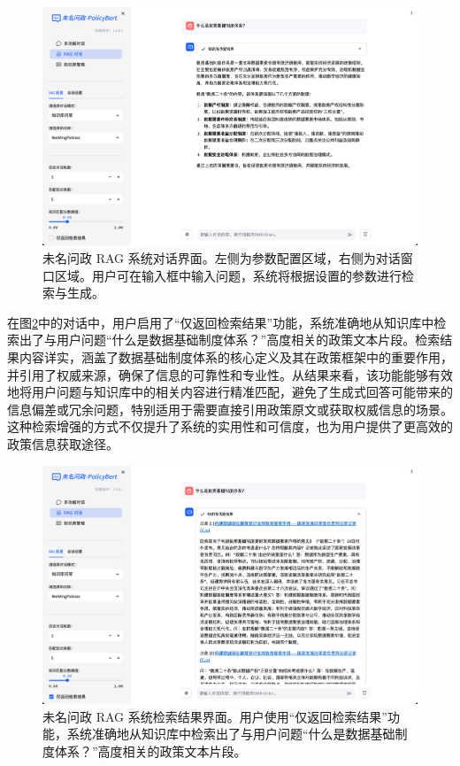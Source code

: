 \documentclass[12pt, a4paper]{ctexart}
\begin{document}
\begin{figure}[H]
    \centering
    \includegraphics[width=1\textwidth]{./images/system_running.png}
    \caption{未名问政 RAG 系统对话界面。左侧为参数配置区域，右侧为对话窗口区域。用户可在输入框中输入问题，系统将根据设置的参数进行检索与生成。}
    \label{fig:system_running}
\end{figure}

在图\ref{fig:system_retrieve_only}中的对话中，用户启用了“仅返回检索结果”功能，系统准确地从知识库中检索出了与用户问题“什么是数据基础制度体系？”高度相关的政策文本片段。检索结果内容详实，涵盖了数据基础制度体系的核心定义及其在政策框架中的重要作用，并引用了权威来源，确保了信息的可靠性和专业性。从结果来看，该功能能够有效地将用户问题与知识库中的相关内容进行精准匹配，避免了生成式回答可能带来的信息偏差或冗余问题，特别适用于需要直接引用政策原文或获取权威信息的场景。这种检索增强的方式不仅提升了系统的实用性和可信度，也为用户提供了更高效的政策信息获取途径。

\begin{figure}[H]
    \centering
    \includegraphics[width=1\textwidth]{./images/system_retrieve_only.png}
    \caption{未名问政 RAG 系统检索结果界面。用户使用“仅返回检索结果”功能，系统准确地从知识库中检索出了与用户问题“什么是数据基础制度体系？”高度相关的政策文本片段。}
    \label{fig:system_retrieve_only}
\end{figure}
\end{document}
